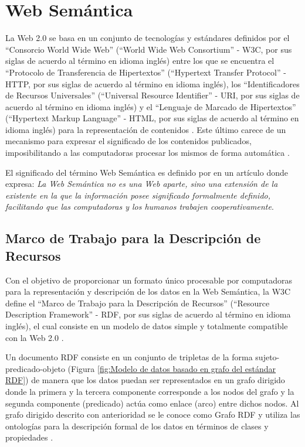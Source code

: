 \section{Web Semántica}
La Web 2.0 se basa en un conjunto de tecnologías y estándares definidos por el ``Consorcio World Wide Web'' (``World Wide Web Consortium'' - W3C, por sus siglas de acuerdo al término en idioma inglés) entre los que se encuentra el ``Protocolo de Transferencia de Hipertextos'' (``Hypertext Transfer Protocol'' - HTTP, por sus siglas de acuerdo al término en idioma inglés), los ``Identificadores de Recursos Universales'' (``Universal Resource Identifier'' - URI, por sus siglas de acuerdo al término en idioma inglés) y el ``Lenguaje de Marcado de Hipertextos'' (``Hypertext Markup Language'' - HTML, por sus siglas de acuerdo al término en idioma inglés) para la representación de contenidos \citep{Masinter2005}. Este último carece de un mecanismo para expresar el significado de los contenidos publicados, imposibilitando a las computadoras procesar los mismos de forma automática \citep{Hidalgo-Delgado2015}.

El significado del término Web Semántica es definido por \cite{Berners-Lee2001} en un artículo donde expresa: \textit{La Web Semántica no es una Web aparte, sino una extensión de la existente en la que la información posee significado formalmente definido, facilitando que las computadoras y los humanos trabajen cooperativamente}. 

\subsection{Marco de Trabajo para la Descripción de Recursos}

Con el objetivo de proporcionar un formato único procesable por computadoras para la representación y descripción de los datos en la Web Semántica, la W3C define el ``Marco de Trabajo para la Descripción de Recursos'' (``Resource Description Framework'' - RDF, por sus siglas de acuerdo al término en idioma inglés), el cual consiste en un modelo de datos simple y totalmente compatible con la Web 2.0 \citep{motik2009bridging,Heath2011}.

Un documento RDF consiste en un conjunto de tripletas de la forma sujeto-predicado-objeto (Figura \ref{fig:Modelo de datos basado en grafo del estándar RDF}) de manera que los datos puedan ser representados en un grafo dirigido donde la primera y la tercera componente corresponde a los nodos del grafo y la segunda componente (predicado) actúa como enlace (arco) entre dichos nodos. Al grafo dirigido descrito con anterioridad se le conoce como Grafo RDF y utiliza las ontologías para la descripción formal de los datos en términos de clases y propiedades \citep{Klyne2004}.


